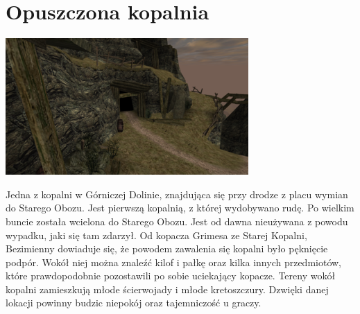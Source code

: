 \documentclass[11pt,polish, openany]{book}
\begin{document}
\section{Opuszczona kopalnia}
\begin{center}
 \includegraphics[scale=1.0]{opuszczonakopalnia.png}
\end{center}
 Jedna z kopalni w Górniczej Dolinie, znajdująca się przy drodze z placu wymian do Starego Obozu. Jest pierwszą kopalnią, z której wydobywano rudę. Po wielkim buncie została wcielona do Starego Obozu. Jest od dawna nieużywana z powodu wypadku, jaki się tam zdarzył. Od kopacza Grimesa ze Starej Kopalni, Bezimienny dowiaduje się, że powodem zawalenia się kopalni było pęknięcie podpór. Wokół niej można znaleźć kilof i pałkę oraz kilka innych przedmiotów, które prawdopodobnie pozostawili po sobie uciekający kopacze. Tereny wokół kopalni zamieszkują młode ścierwojady i młode kretoszczury.
 Dzwięki danej lokacji powinny budzic niepokój oraz tajemniczość u graczy.
\end{document}
